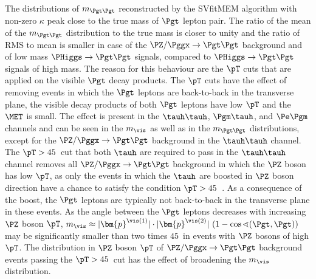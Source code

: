 The distributions of $m_{\Pgt\Pgt}$ reconstructed by the SVfitMEM algorithm with non-zero $\kappa$ 
peak close to the true mass of $\Pgt$ lepton pair.
The ratio of the mean of the $m_{\Pgt\Pgt}$ distribution to the true mass is closer to unity and the ratio of RMS to mean is smaller
in case of the $\PZ/\Pggx \to \Pgt\Pgt$ background and of low mass $\PHiggs \to \Pgt\Pgt$ signals, compared to $\PHiggs \to \Pgt\Pgt$ signals of high mass.
The reason for this behaviour are the $\pT$ cuts that are applied on the visible $\Pgt$ decay products.
The $\pT$ cuts have the effect of removing events in which the $\Pgt$ leptons are back-to-back in the transverse plane,
the visible decay products of both $\Pgt$ leptons have low $\pT$ and the $\MET$ is small.
The effect is present in the $\tauh\tauh$, $\Pgm\tauh$, and $\Pe\Pgm$ channels and can be seen in the $m_{\vis}$ as well as in the $m_{\Pgt\Pgt}$ distributions,
except for the $\PZ/\Pggx \to \Pgt\Pgt$ background in the $\tauh\tauh$ channel.
The $\pT > 45$~\GeV cut that both $\tauh$ are required to pass in the $\tauh\tauh$ channel removes all $\PZ/\Pggx \to \Pgt\Pgt$ background in which the $\PZ$ boson has low $\pT$,
as only the events in which the $\tauh$ are boosted in $\PZ$ boson direction have a chance to satisfy the condition $\pT > 45$~\GeV.
As a consequence of the boost, the $\Pgt$ leptons are typically not back-to-back in the transverse plane in these events.
As the angle between the $\Pgt$ leptons decreases with increasing $\PZ$ boson $\pT$,
$m_{\vis} \approx \vert\bm{p}^{\vis(1)}\vert \cdot \vert\bm{p}^{\vis(2)}\vert \, \left( 1 - \cos\sphericalangle(\Pgt,\Pgt) \right)$
may be significantly smaller than two times $45$~\GeV in events with $\PZ$ bosons of high $\pT$.
The distribution in $\PZ$ boson $\pT$ of $\PZ/\Pggx \to \Pgt\Pgt$ background events passing the $\pT > 45$~\GeV cut
has the effect of broadening the $m_{\vis}$ distribution.

